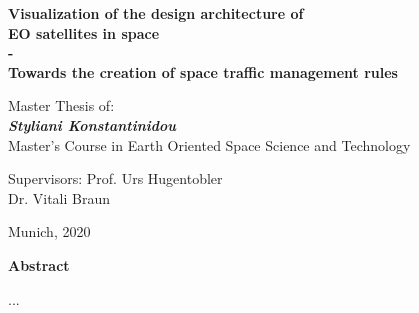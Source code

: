 \vspace{3.5cm}
\begin{center}
\Large{\textbf{Visualization of the design architecture of \\EO satellites in space \\- \\}}
\Large{\textbf{Towards the creation of space traffic management rules}}
\end{center}
\vspace{2.2cm}
\begin{center}
\large{Master Thesis of:\\
\textit{\textbf{Styliani Konstantinidou}} \\}
\vspace{1cm}
\large{Master's Course in Earth Oriented Space Science and Technology}
\end{center}

\vspace{2.65cm}
\begin{flushleft}
\large{Supervisors: Prof. Urs Hugentobler \\ \hspace*{2.7cm}Dr. Vitali Braun}
\end{flushleft}

\vfill
\begin{center}
\normalsize Munich, 2020
\end{center}



\newpage \mbox{} %
\newpage \mbox{}
\thispagestyle{empty}
\begin{center}
\Large{\textbf{Abstract}} 
\end{center}
\par 	
...

%


\vspace{\fill} %

